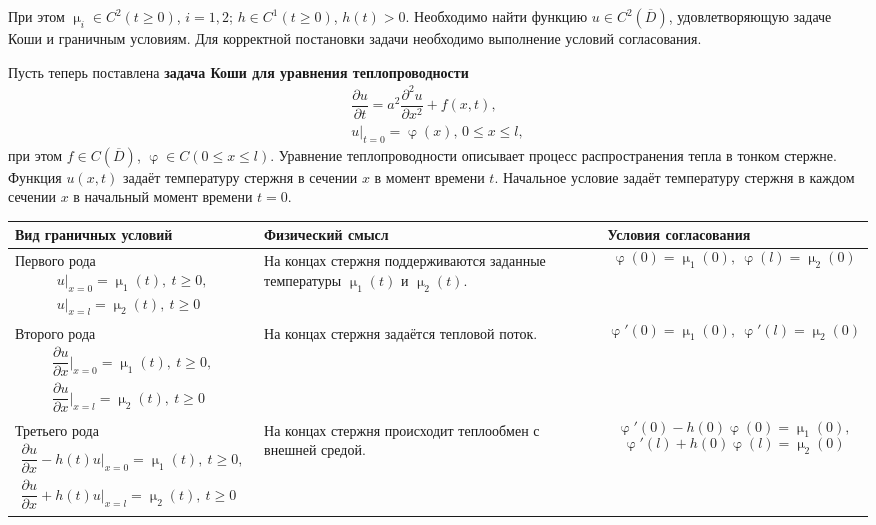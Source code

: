 \documentclass[a4paper, 12pt]{report}
\numberwithin{equation}{section}
\renewcommand{\leq}{\leqslant}
\renewcommand{\geq}{\geqslant}
\renewcommand{\varphi}{\upvarphi}
\renewcommand{\mu}{\upmu}
\newcommand{\pderiv}[2]{\dfrac{\partial #1}{\partial #2}}
\begin{document}
	При этом $\mu_i\in C^2(t\geq 0)$, $i=1,2$; $h\in C^1(t\geq 0)$, $h(t)>0$. Необходимо найти функцию
	$u\in C^2(\overline{D})$, удовлетворяющую задаче Коши и граничным условиям. Для корректной постановки задачи необходимо выполнение условий согласования.
	
	
	Пусть теперь поставлена \textbf{задача Коши для уравнения теплопроводности}
	\begin{equation}
		\begin{gathered}
			\pderiv{u}{t}=a^2\pderiv{^2u}{x^2}+f(x,t),\\
			u|_{t=0}=\varphi(x)\text{, } 0\leq x\leq l,
		\end{gathered}
	\end{equation}
	при этом $f\in C(\overline{D})$, $\varphi\in C(0\leq x\leq l)$. Уравнение теплопроводности описывает процесс распространения тепла в тонком стержне. Функция $u(x,t)$ задаёт температуру стержня в сечении $x$ в момент времени $t$. Начальное условие задаёт температуру стержня в каждом сечении $x$ в начальный момент времени $t=0$.
	\begin{table}[h!]
		\renewcommand{\arraystretch}{1.4}
		\begin{tabular}{|p{5.5cm}|p{4.5cm}|p{7cm}|}
			\hline
			\textbf{Вид граничных условий} & \textbf{Физический смысл} & \textbf{Условия согласования} \\
			\hline
			{Первого рода} 
			$$\begin{gathered}
				u|_{x=0}=\mu_1(t),\ t \geq 0,\\
				u|_{x=l}=\mu_2(t),\ t \geq 0
			\end{gathered}$$
			&
			На концах стержня поддерживаются заданные температуры $\mu_1(t)$ и $\mu_2(t)$.
			&
			$$\varphi(0)=\mu_1(0),\ \varphi(l)=\mu_2(0)$$
			\\
			\hline
			
			{Второго рода}
			$$\begin{gathered}
				\pderiv{u}{x}\Bigr|_{x=0}=\mu_1(t),\ t\geq 0,\\
				\pderiv{u}{x}\Bigr|_{x=l}=\mu_2(t),\ t\geq 0
			\end{gathered}$$
			&
			На концах стержня задаётся тепловой поток.
			&
			$$\varphi'(0)=\mu_1(0),\ \varphi'(l)=\mu_2(0)$$
			\\
			\hline
			
			{Третьего рода}
			$$\begin{gathered}
				\pderiv{u}{x}-h(t)u\Bigr|_{x=0}=\mu_1(t),\ t\geq 0,\\
				\pderiv{u}{x}+h(t)u\Bigr|_{x=l}=\mu_2(t),\ t\geq 0
			\end{gathered}$$
			&
			На концах стержня происходит теплообмен с внешней средой.
			&
			$$\varphi'(0) - h(0)\varphi(0) = \mu_1(0),$$ 
			$$\varphi'(l) + h(0)\varphi(l) = \mu_2(0)$$
			\\
			\hline
		\end{tabular}
	\end{table}
	
\end{document}
